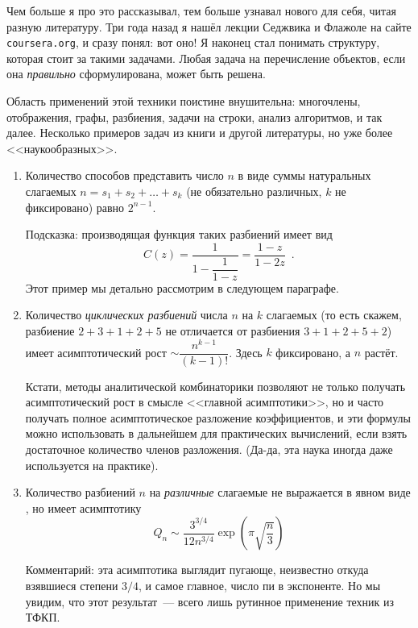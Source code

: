 \documentclass[a5paper]{article}
\theoremstyle{definition}
\begin{document}
Чем больше я про это рассказывал, тем больше узнавал нового для себя, читая 
разную литературу. Три года назад я нашёл лекции Седжвика и Флажоле \cite{ac} 
на сайте \texttt{coursera.org}, и сразу понял: вот оно! Я наконец стал понимать 
структуру, которая стоит за такими задачами. Любая задача на перечисление 
объектов, если она \textit{правильно} сформулирована, может быть решена.

Область применений этой техники поистине внушительна: многочлены, отображения, 
графы, разбиения, задачи на строки, анализ алгоритмов, и так далее. Несколько 
примеров задач из книги \cite{ac} и другой литературы, но уже более 
<<наукообразных>>.

\begin{enumerate}
	\item Количество способов представить число \( n \) в виде суммы 
	натуральных слагаемых \( n = s_1 + s_2 + \ldots + s_k \) (не обязательно 
	различных, \( k \) не фиксировано) равно \( 2^{n-1} \).
	
	Подсказка: производящая функция таких разбиений имеет вид
	\[
		C(z) = \dfrac{1}{1 - \dfrac{1}{1-z}} = \dfrac{1-z}{1 - 2z}
		\enspace .
	\]
	Этот пример мы детально рассмотрим в следующем параграфе.
	\item Количество \textit{циклических разбиений} числа \( n \) на \( k \) 
	слагаемых (то есть скажем, разбиение \( 2 + 3 + 1 + 2 + 5 \) не отличается 
	от разбиения \( 3 + 1 + 2 + 5 + 2 \)) имеет асимптотический рост \( \sim 
	\dfrac{n^{k-1}}{(k-1)!} \). Здесь \( k \) фиксировано, а \( n \)  растёт.
	
	Кстати, методы аналитической комбинаторики позволяют не только получать 
	асимптотический рост в смысле <<главной асимптотики>>, но и часто получать 
	полное 
	асимптотическое разложение коэффициентов, и эти формулы можно использовать 
	в дальнейшем для практических вычислений, если взять достаточное количество 
	членов разложения. (Да-да, эта наука иногда даже используется на практике).
	\item Количество разбиений \( n \) на \textit{различные} слагаемые не 
	выражается в явном виде \cite[section VIII.6, p.574]{ac}, но имеет 
	асимптотику
	\[
		Q_n \sim \dfrac{3^{3/4}}{12 n^{3/4}} \exp \left( \pi \sqrt{\dfrac n 3} 
		\right)
	\]
	
	Комментарий: эта асимптотика выглядит пугающе, неизвестно откуда взявшиеся 
	степени \( 3/4 \), и самое главное, число пи в экспоненте. Но мы увидим, 
	что этот результат~--- всего лишь рутинное применение техник из ТФКП.
	

\end{enumerate}
\end{document}
